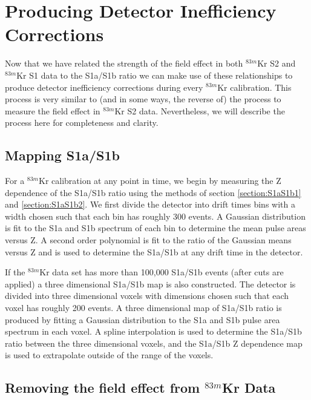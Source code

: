 \documentclass[a4paper,10pt,twocolumn]{article}
\begin{document}
\section{Producing Detector Inefficiency Corrections} \label{KrypCalCode}

Now that we have related the strength of the field effect in both $^{83m}$Kr S2 and $^{83m}$Kr S1 data to the S1a/S1b ratio we can make use of these relationships to produce detector inefficiency corrections during every $^{83m}$Kr calibration.  This process is very similar to (and in some ways, the reverse of) the process to measure the field effect in $^{83m}$Kr S2 data. Nevertheless, we will describe the process here for completeness and clarity.

\subsection{Mapping S1a/S1b}

For a $^{83m}$Kr calibration at any point in time, we begin by measuring the Z dependence of the S1a/S1b ratio using the methods of section  \ref{section:S1aS1b1} and  \ref{section:S1aS1b2}.  We first divide the detector into drift times bins with a width chosen such that each bin has roughly 300 events.   A Gaussian distribution is fit to the S1a and S1b spectrum of each bin to determine the mean pulse areas versus Z.  A second order polynomial is fit to the ratio of the Gaussian means versus Z and is used to determine the S1a/S1b at any drift time in the detector.  

If the $^{83m}$Kr data set has more than 100,000 S1a/S1b events (after cuts are applied) a three dimensional S1a/S1b map is also constructed. The detector is divided into three dimensional voxels with dimensions chosen such that each voxel has roughly 200 events.  A three dimensional map of S1a/S1b ratio is produced by fitting a Gaussian distribution to the S1a and S1b pulse area spectrum in each voxel.  A spline interpolation is used to determine the S1a/S1b ratio between the three dimensional voxels, and the S1a/S1b Z dependence map is used to extrapolate outside of the range of the voxels. 

\subsection{Removing the field effect from $^{83m}$Kr Data}
\end{document}
